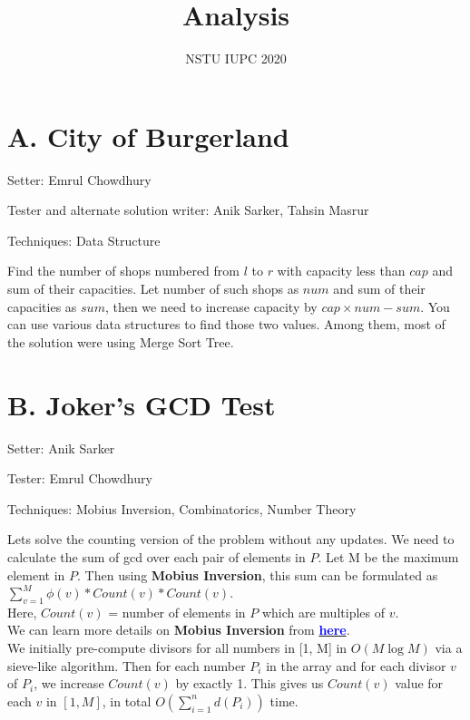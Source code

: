 \documentclass{article}
\title{\Huge{Analysis}}
\author{\Large{NSTU IUPC 2020}}
\date{} %
\begin{document}
\maketitle

\section*{A. City of Burgerland}

\noindent Setter: Emrul Chowdhury

\noindent Tester and alternate solution writer: Anik Sarker, Tahsin Masrur

\noindent Techniques: Data Structure

\vspace{0.5cm}

Find the number of shops numbered from $l$ to $r$ with capacity less than $cap$ and sum of their capacities. Let number of such shops as $num$ and sum of their capacities as $sum$, then we need to increase capacity by $cap \times num - sum$. You can use various data structures to find those two values. Among them, most of the solution were using Merge Sort Tree.

\section*{B. Joker's GCD Test}
\noindent Setter: Anik Sarker

\noindent Tester: Emrul Chowdhury    

\noindent Techniques: Mobius Inversion, Combinatorics, Number Theory

\vspace{0.5cm}

Lets solve the counting version of the problem without any updates. We need to calculate the sum of gcd over each pair of elements in $P$. Let M be the maximum element in $P$. Then using \textbf{Mobius Inversion}, this sum can be formulated as $\sum_{v=1}^{M} \phi(v) * Count(v) * Count(v)$.\\
Here, $Count(v)$ = number of elements in $P$ which are multiples of $v$.\\
We can learn more details on \textbf{Mobius Inversion} from \href{https://codeforces.com/blog/entry/53925}{\textcolor{blue}{\textbf{here}}}.\\

We initially pre-compute divisors for all numbers in [1, M] in $O(M \log M)$ via a sieve-like algorithm. Then for each number $P_i$ in the array and for each divisor $v$ of $P_i$, we increase $Count(v)$ by exactly 1. This gives us $Count(v)$ value for each $v$ in $[1, M]$, in total $O(\sum_{i=1}^{n} d(P_i))$ time.\\
\end{document}
